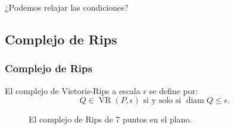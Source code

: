 \documentclass{beamer}
\DeclareMathOperator{\diam}{diam}
\DeclareMathOperator{\VR}{VR}
\begin{document}
\begin{frame}
\begin{center}
  ¿Podemos relajar las condiciones?
\end{center} 
\end{frame}

\subsection{Complejo de Rips}

\begin{frame}\frametitle{Complejo de Rips}
  \begin{Definicion}
  El complejo de Vietoris-Rips a escala \(\epsilon\) se define por: 
    \begin{equation*}
      Q\in \VR(P,\epsilon) 
      \text{ si y solo si }
      \diam Q \le \epsilon.
    \end{equation*}
  \end{Definicion}

  \begin{figure}[H]
    \begin{columns}
    \centering{}
    \caption{El complejo de Rips de 7 puntos en el plano.}
    \end{columns}
  \end{figure}

\end{frame}
\end{document}
